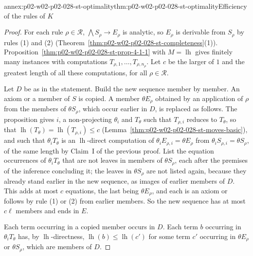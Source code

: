 \begin{annexitem}{annex:p02-w02-p02-028-st-optimality}{thm:p02-w02-p02-028-st-optimality}{Efficiency of the rules of \(K\)}
\begin{proof}
For each rule \(\rho\in\mathcal R\), \(\bigwedge S_\rho\to E_\rho\) is
analytic, so \(E_\rho\) is derivable from \(S_\rho\) by rules (1) and (2)
(Theorem~\ref{thm:p02-w02-p02-028-st-completeness}(1)).
Proposition~\ref{thm:p02-w02-p02-028-st-prop-4-1-1} with
\(M=\operatorname{lh}\) gives finitely many instances with computations
\(T_{\rho,1},\ldots,T_{\rho,n_\rho}\).  Let \(c\) be the larger of \(1\) and
the greatest length of all these computations, for all \(\rho\in\mathcal R\).

Let \(D\) be as in the statement.  Build the new sequence member by member.
An axiom or a member of \(S\) is copied.  A member \(\theta E_\rho\) obtained
by an application of \(\rho\) from the members of \(\theta S_\rho\), which
occur earlier in \(D\), is replaced as follows.  The proposition gives \(i\),
a non-projecting \(\theta_i\) and \(T_\theta\) such that \(T_{\rho,i}\)
reduces to \(T_\theta\), so that
\(\operatorname{lh}(T_\theta)=\operatorname{lh}(T_{\rho,i})\leq c\)
(Lemma~\ref{thm:p02-w02-p02-028-st-moves-basic}), and such that
\(\theta_iT_\theta\) is an \(\operatorname{lh}\)-direct computation of
\(\theta_iE_{\rho,i}=\theta E_\rho\) from \(\theta_iS_{\rho,i}=\theta S_\rho\),
of the same length by Claim~I of the previous proof.  List the equation
occurrences of \(\theta_iT_\theta\) that are not leaves in members of
\(\theta S_\rho\), each after the premises of the inference concluding it;
the leaves in \(\theta S_\rho\) are not listed again, because they already
stand earlier in the new sequence, as images of earlier members of \(D\).
This adds at most \(c\) equations, the last being \(\theta E_\rho\), and each
is an axiom or follows by rule (1) or (2) from earlier members.  So the new
sequence has at most \(c\ell\) members and ends in \(E\).

Each term occurring in a copied member occurs in \(D\).  Each term \(b\)
occurring in \(\theta_iT_\theta\) has, by \(\operatorname{lh}\)-directness,
\(\operatorname{lh}(b)\leq\operatorname{lh}(c')\) for some term \(c'\)
occurring in \(\theta E_\rho\) or \(\theta S_\rho\), which are members of
\(D\).
\end{proof}
\end{annexitem}
